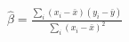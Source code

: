\documentclass[border=15pt]{standalone}
\begin{document}
$\displaystyle \widehat\beta = \frac{\sum_i(x_i-\bar x)(y_i-\bar y)}{\sum_i(x_i-\bar x)^2}$
\end{document}
